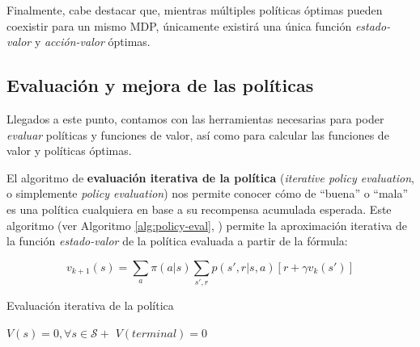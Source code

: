 Finalmente, cabe destacar que, mientras múltiples políticas óptimas pueden coexistir para un mismo MDP, únicamente existirá una única función \textit{estado-valor} y \textit{acción-valor} óptimas.

\subsection{Evaluación y mejora de las políticas}

Llegados a este punto, contamos con las herramientas necesarias para poder \textit{evaluar} políticas y funciones de valor, así como para calcular las funciones de valor y políticas óptimas.

El algoritmo de \textbf{evaluación iterativa de la política} (\textit{iterative policy evaluation}, o simplemente \textit{policy evaluation}) nos permite conocer cómo de ``buena'' o ``mala'' es una política cualquiera en base a su recompensa acumulada esperada. Este algoritmo (ver Algoritmo \ref{alg:policy-eval}, \cite{sutton2018reinforcement}) permite la aproximación iterativa de la función \textit{estado-valor} de la política evaluada a partir de la fórmula:

\begin{equation}
    v_{k+1}(s) =  \sum_{a} \pi(a|s) \sum_{s',r} p(s',r|s,a)[r + \gamma v_k(s')]
\end{equation}

\begin{algorithm}
\caption{Evaluación iterativa de la política}
\label{alg:policy-eval}
\DontPrintSemicolon
\LinesNumbered
{}

    $V(s) = 0, \forall s \in \mathcal{S}+$\;
    $V(terminal) = 0$\;
    
    

\end{algorithm}

